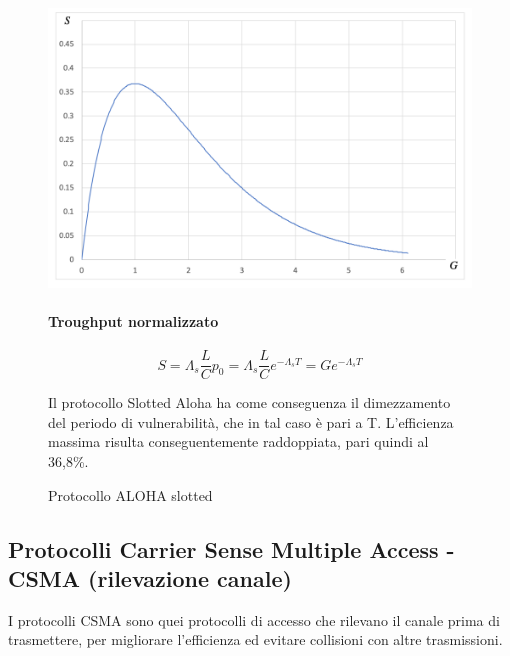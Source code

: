 \begin{figure}[htbp]
    \centering
    \begin{minipage}{0.425\textwidth}
        \includegraphics[width=\linewidth]{images/slottedgrafico.png}
        \caption{Protocollo ALOHA slotted}
        \label{fig:slotted-aloha}
    \end{minipage}%
    \hfill
    \begin{minipage}{0.45\textwidth}
        \paragraph{Troughput normalizzato}

\begin{equation}
    S = \Lambda_s \frac{L}{C}p_0 = \Lambda_s \frac{L}{C}e^{-\Lambda_s T} = G e^{-\Lambda_s T}
\end{equation}

Il protocollo Slotted Aloha ha come conseguenza il dimezzamento del periodo di vulnerabilità, che in tal caso è pari a T. L'efficienza massima risulta conseguentemente raddoppiata, pari quindi al 36,8\%.

    \end{minipage}
\end{figure}

\newpage


\subsection{Protocolli Carrier Sense Multiple Access - CSMA (rilevazione canale)}

I protocolli CSMA sono quei protocolli di accesso che rilevano il canale prima di trasmettere, per migliorare l'efficienza ed evitare collisioni con altre trasmissioni.
 
